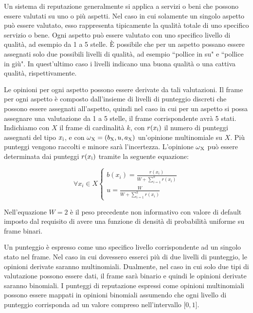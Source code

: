 \documentclass{report}
\begin{document}
	Un sistema di reputazione generalmente si applica a servizi o beni che
	possono essere valutati su uno o più aspetti. Nel caso in cui solamente
	un singolo aspetto può essere valutato, esso rappresenta tipicamente la
	qualità totale di uno specifico servizio o bene. Ogni aspetto può essere
	valutato con uno specifico livello di qualità, ad esempio da 1 a 5
	stelle. È possibile che per un aspetto possano essere assegnati solo due
	possibili livelli di qualità, ad esempio ``pollice in su" e ``pollice in
	giù". In quest'ultimo caso i livelli indicano una buona qualità o una
	cattiva qualità, rispettivamente.
	
	Le opinioni per ogni aspetto possono essere derivate da tali
	valutazioni. Il frame per ogni aspetto è composto dall'insieme di
	livelli di punteggio discreti che possono essere assegnati all'aspetto,
	quindi nel caso in cui per un aspetto si possa assegnare una valutazione
	da 1 a 5 stelle, il frame corrispondente avrà 5 stati. Indichiamo con $X$
	il frame di cardinalità $k$, con $r(x\textsubscript{i})$ il numero di punteggi assegnati del
	tipo $x\textsubscript{i}$, e con $\omega\textsubscript{X} =(b\textsubscript{X},u,a\textsubscript{X})$ un'opinione multinomiale su $X$. Più punteggi
	vengono raccolti e minore sarà l'incertezza. L'opinione $\omega\textsubscript{X}$ può
	essere determinata dai punteggi $r(x\textsubscript{i})$ tramite la seguente equazione:
	
	\begin{center}
	\begin{equation}
		\forall x_i \in X \begin{cases}
								b(x_i)=\frac{r(x_i)}{W+\sum_{i=1}^k r(x_i)}\\
								u=\frac{W}{W+\sum_{i=1}^k r(x_i)}
							\end{cases}
							\label{equazione5}
	\end{equation}
	\end{center}
	
	
	
	Nell'equazione $W = 2$ è il peso precedente non informativo con valore di
	default imposto dal requisito di avere una funzione di densità di
	probabilità uniforme su frame binari.
	
	Un punteggio è espresso come uno specifico livello corrispondente ad un
	singolo stato nel frame. Nel caso in cui dovessero esserci più di due
	livelli di punteggio, le opinioni derivate saranno multinomiali. Dualmente,
	nel caso in cui solo due tipi di valutazione possono essere dati, il
	frame sarà binario e quindi le opinioni derivate saranno binomiali. I punteggi
	di reputazione espressi come opinioni multinomiali possono essere
	mappati in opinioni binomiali assumendo che ogni livello di punteggio
	corrisponda ad un valore compreso nell'intervallo ${[}0,1{]}$.
	
\end{document}
